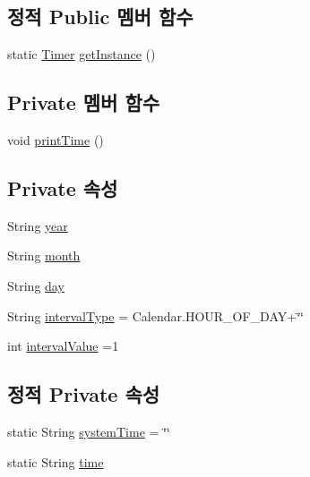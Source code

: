 \subsection*{정적 Public 멤버 함수}
\begin{DoxyCompactItemize}
\item 
static \mbox{\hyperlink{classcom_1_1github_1_1aites_1_1framework_1_1framework_1_1_timer}{Timer}} \mbox{\hyperlink{classcom_1_1github_1_1aites_1_1framework_1_1framework_1_1_timer_af355c137bbc1cd2804b908946493d986}{get\+Instance}} ()
\end{DoxyCompactItemize}
\subsection*{Private 멤버 함수}
\begin{DoxyCompactItemize}
\item 
void \mbox{\hyperlink{classcom_1_1github_1_1aites_1_1framework_1_1framework_1_1_timer_a33a5477618b0c9ec0fdb4f3446cad4f1}{print\+Time}} ()
\end{DoxyCompactItemize}
\subsection*{Private 속성}
\begin{DoxyCompactItemize}
\item 
String \mbox{\hyperlink{classcom_1_1github_1_1aites_1_1framework_1_1framework_1_1_timer_aa8703c39746c1952e9e969472d3beca4}{year}}
\item 
String \mbox{\hyperlink{classcom_1_1github_1_1aites_1_1framework_1_1framework_1_1_timer_a787e26630dfa348baa4e02172128ea3a}{month}}
\item 
String \mbox{\hyperlink{classcom_1_1github_1_1aites_1_1framework_1_1framework_1_1_timer_a875396d63f45c8cd4db75f3b85ac398d}{day}}
\item 
String \mbox{\hyperlink{classcom_1_1github_1_1aites_1_1framework_1_1framework_1_1_timer_ad5e2632bfab589198a61fafd60f68d18}{interval\+Type}} = Calendar.\+H\+O\+U\+R\+\_\+\+O\+F\+\_\+\+D\+AY+\char`\"{}\char`\"{}
\item 
int \mbox{\hyperlink{classcom_1_1github_1_1aites_1_1framework_1_1framework_1_1_timer_a6c5effea2583bc276ac7c4b1d40e12d7}{interval\+Value}} =1
\end{DoxyCompactItemize}
\subsection*{정적 Private 속성}
\begin{DoxyCompactItemize}
\item 
static String \mbox{\hyperlink{classcom_1_1github_1_1aites_1_1framework_1_1framework_1_1_timer_a22ebaa7134740910d846b3bdbd416aef}{system\+Time}} = \char`\"{}\char`\"{}
\item 
static String \mbox{\hyperlink{classcom_1_1github_1_1aites_1_1framework_1_1framework_1_1_timer_a04901e0f7fd1f7024218cba52d7a8b26}{time}}
\end{DoxyCompactItemize}


